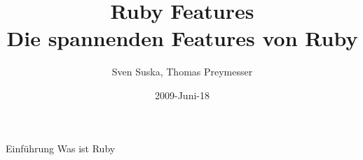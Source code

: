 \documentclass{beamer}
\title[Ruby]{Ruby Features\\Die spannenden Features von Ruby}
\author{Sven Suska, Thomas Preymesser}
\date{2009-Juni-18}
\begin{document}
\begin{frame}
\titlepage
\end{frame}


\begin{frame}{Einführung}
Was ist Ruby
\end{frame}
\end{document}
